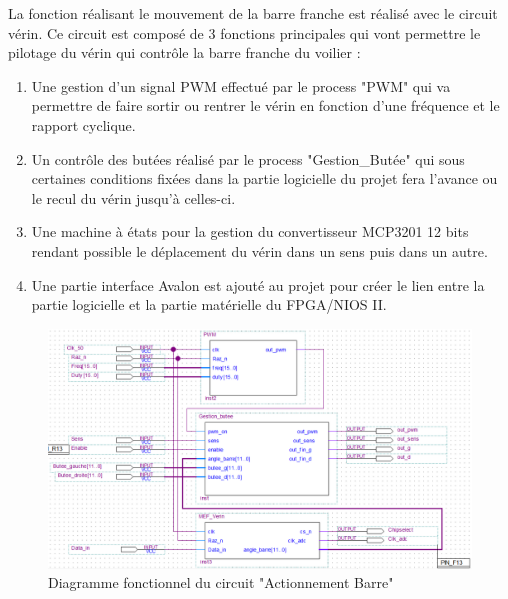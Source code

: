   La fonction réalisant le mouvement de la barre franche est réalisé avec le circuit vérin. Ce circuit est composé de 3 fonctions principales qui vont permettre le pilotage du vérin qui contrôle la barre franche du voilier :\vspace{0.5cm}
\begin{enumerate}
    \item Une gestion d'un signal PWM effectué par le process "PWM" qui va permettre de faire sortir ou rentrer le vérin en fonction d'une fréquence et le rapport cyclique. 
    \item Un contrôle des butées réalisé par le process "Gestion\_Butée" qui sous certaines conditions fixées dans la partie logicielle du projet fera l'avance ou le recul du vérin jusqu'à celles-ci.
    \item Une machine à états pour la gestion du convertisseur MCP3201 12 bits rendant possible le déplacement du vérin dans un sens puis dans un autre.
    \item Une partie interface Avalon est ajouté au projet pour créer le lien entre la partie logicielle et la partie matérielle du FPGA/NIOS II.
\end{enumerate} 

  \begin{figure}[h]
    \begin{center}
      \includegraphics[width=\textwidth]{images/verin.png}
      \caption{Diagramme fonctionnel du circuit "Actionnement Barre"}
    \end{center}
  \end{figure}

\newpage 

